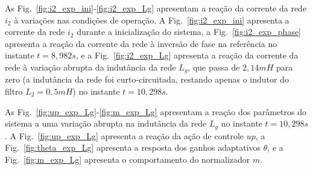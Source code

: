   As Fig.~\ref{fig:i2_exp_ini}-\ref{fig:i2_exp_Lg} apresentam a reação da corrente da rede $i_2$ à variações nas condições de operação. A Fig.~\ref{fig:i2_exp_ini} apresenta a corrente da rede $i_2$ durante a inicialização do sistema, a Fig.~\ref{fig:i2_exp_phase} apresenta a reação da corrente da rede à inversão de fase na referência no instante $t=8,982 s$, e a Fig.~\ref{fig:i2_exp_Lg} apresenta a reação da corrente da rede à variação abrupta da indutância da rede $L_g$, que passa de $2,14mH$ para zero (a indutância da rede foi curto-circuitada, restando apenas o indutor do filtro $L_2 = 0,5mH$) no instante $t=10,298 s$.

  \vfill
  \noindent
  \begin{minipage}{\textwidth}
    \makebox[\textwidth]{
      \centering
      \def\svgwidth{\textwidth}
      }
    \label{fig:i2_exp_ini}
  \end{minipage}
  \vfill

  \newpage

  \vfill

  \noindent
  \begin{minipage}{\textwidth}
    \makebox[\textwidth]{
      \centering
      \def\svgwidth{\textwidth}
      }
    \label{fig:i2_exp_phase}
  \end{minipage}

  \vfill
  \vspace{\fill}
  \noindent
  \begin{minipage}{\textwidth}
    \makebox[\textwidth]{
      \centering
      \def\svgwidth{\textwidth}
      }
    \label{fig:i2_exp_Lg}
  \end{minipage}
  \vfill

  \newpage

  As Fig.~\ref{fig:up_exp_Lg}-\ref{fig:m_exp_Lg} apresentam a reação dos parâmetros do sistema a uma variação abrupta na indutância da rede $L_g$ no instante $t=10,298 s$. A Fig.~\ref{fig:up_exp_Lg} apresenta a reação da ação de controle $up$, a Fig.~\ref{fig:theta_exp_Lg} apresenta a resposta dos ganhos adaptativos $\theta$, e a Fig.~\ref{fig:m_exp_Lg} apresenta o comportamento do normalizador $m$.

